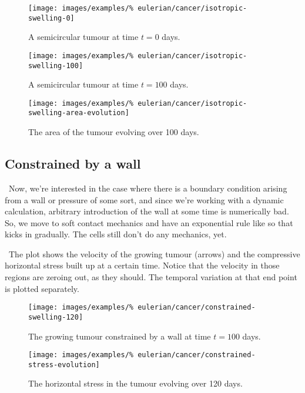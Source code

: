 \begin{figure}[!hptb]
\centering
\texttt{[image: images/examples/\%
eulerian/cancer/isotropic-swelling-0]}
\caption{A semicircular tumour at time $t=0$ days.}
\label{tumour-isotropic-swelling-0}
\end{figure}

\begin{figure}[!hptb]
\centering
\texttt{[image: images/examples/\%
eulerian/cancer/isotropic-swelling-100]}
\caption{A semicircular tumour at time $t=100$ days.}
\label{tumour-isotropic-swelling-100}
\end{figure}

\begin{figure}[!hptb]
\centering
\texttt{[image: images/examples/\%
eulerian/cancer/isotropic-swelling-area-evolution]}
\caption{The area of the tumour evolving over 100 days.}
\label{tumour-isotropic-area-evolution}
\end{figure}

\clearpage

\subsection{Constrained by a wall}
\label{wall-constraint}

\textbullet\ Now, we're interested in the case where there is a boundary condition
arising from a wall or pressure of some sort, and since we're working
with a dynamic calculation, arbitrary introduction of the wall at some
time is numerically bad. So, we move to soft contact mechanics and
have an exponential rule like so that kicks in gradually. The cells
still don't do any mechanics, yet.

\textbullet\ The plot shows the velocity of the growing tumour
(arrows) and the compressive horizontal stress built up at a certain
time. Notice that the velocity in those regions are zeroing out, as
they should. The temporal variation at that end point is plotted separately.

\begin{figure}[!hptb]
\centering
\texttt{[image: images/examples/\%
eulerian/cancer/constrained-swelling-120]}
\caption{The growing tumour constrained by a wall at time $t=100$ days.}
\label{tumour-constrained-swelling-120}
\end{figure}

\begin{figure}[!hptb]
\centering
\texttt{[image: images/examples/\%
eulerian/cancer/constrained-stress-evolution]}
\caption{The horizontal stress in the tumour evolving over 120 days.}
\label{tumour-constrained-stress-evolution}
\end{figure}

